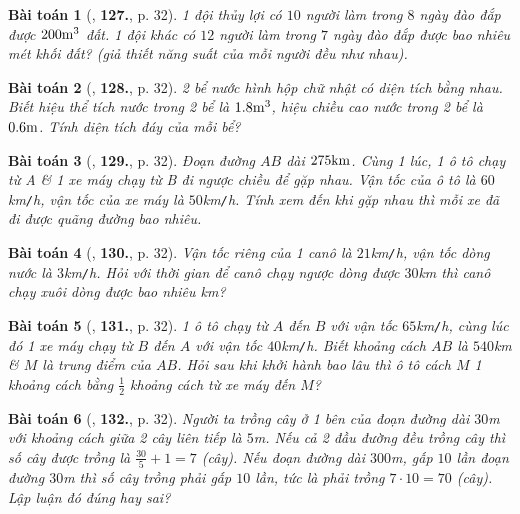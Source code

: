 \documentclass{article}
\numberwithin{equation}{section}
\newtheorem{baitoan}{Bài toán}
\begin{document}
\begin{baitoan}[\cite{Tuyen_Toan_7}, \textbf{127.}, p. 32]
	1 đội thủy lợi có $10$ người làm trong $8$ ngày đào đắp được $\rm200m^3$ đất. 1 đội khác có $12$ người làm trong $7$ ngày đào đắp được bao nhiêu mét khối đất? (giả thiết năng suất của mỗi người đều như nhau).
\end{baitoan}

\begin{baitoan}[\cite{Tuyen_Toan_7}, \textbf{128.}, p. 32]
	2 bể nước hình hộp chữ nhật có diện tích bằng nhau. Biết hiệu thể tích nước trong 2 bể là $\rm1.8m^3$, hiệu chiều cao nước trong 2 bể là $\rm0.6m$. Tính diện tích đáy của mỗi bể?
\end{baitoan}

\begin{baitoan}[\cite{Tuyen_Toan_7}, \textbf{129.}, p. 32]
	Đoạn đường $AB$ dài $\rm275km$. Cùng 1 lúc, 1 ô tô chạy từ A \& 1 xe máy chạy từ B đi ngược chiều để gặp nhau. Vận tốc của ô tô là $60$\emph{km\texttt{/}h}, vận tốc của xe máy là $50$\emph{km\texttt{/}h}. Tính xem đến khi gặp nhau thì mỗi xe đã đi được quãng đường bao nhiêu.
\end{baitoan}

\begin{baitoan}[\cite{Tuyen_Toan_7}, \textbf{130.}, p. 32]
	Vận tốc riêng của 1 canô là $21$\emph{km\texttt{/}h}, vận tốc dòng nước là $3$\emph{km\texttt{/}h}. Hỏi với thời gian để canô chạy ngược dòng được $30$\emph{km} thì canô chạy xuôi dòng được bao nhiêu \emph{km}?
\end{baitoan}

\begin{baitoan}[\cite{Tuyen_Toan_7}, \textbf{131.}, p. 32]
	1 ô tô chạy từ $A$ đến $B$ với vận tốc $65$\emph{km\texttt{/}h}, cùng lúc đó 1 xe máy chạy từ $B$ đến $A$ với vận tốc $40$\emph{km\texttt{/}h}. Biết khoảng cách $AB$ là $540$\emph{km} \& $M$ là trung điểm của $AB$. Hỏi sau khi khởi hành bao lâu thì ô tô cách $M$ 1 khoảng cách bằng $\frac{1}{2}$ khoảng cách từ xe máy đến $M$?
\end{baitoan}

\begin{baitoan}[\cite{Tuyen_Toan_7}, \textbf{132.}, p. 32]
	Người ta trồng cây ở 1 bên của đoạn đường dài $30$\emph{m} với khoảng cách giữa 2 cây liên tiếp là $5$\emph{m}. Nếu cả 2 đầu đường đều trồng cây thì số cây được trồng là $\frac{30}{5} + 1 = 7$ (cây). Nếu đoạn đường dài $300$\emph{m}, gấp $10$ lần đoạn đường $30$\emph{m} thì số cây trồng phải gấp $10$ lần, tức là phải trồng $7\cdot 10 = 70$ (cây). Lập luận đó đúng hay sai?
\end{baitoan}
\end{document}
